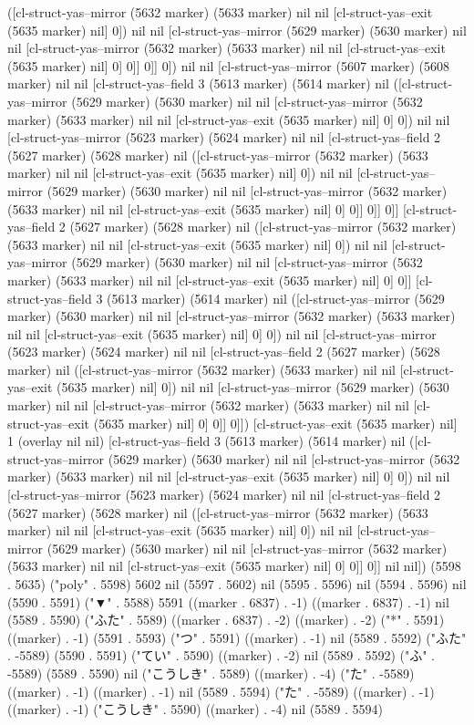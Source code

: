 ([cl-struct-yas--mirror (5632 marker) (5633 marker) nil nil [cl-struct-yas--exit (5635 marker) nil] 0]) nil nil [cl-struct-yas--mirror (5629 marker) (5630 marker) nil nil [cl-struct-yas--mirror (5632 marker) (5633 marker) nil nil [cl-struct-yas--exit (5635 marker) nil] 0] 0]] 0]] 0]) nil nil [cl-struct-yas--mirror (5607 marker) (5608 marker) nil nil [cl-struct-yas--field 3 (5613 marker) (5614 marker) nil ([cl-struct-yas--mirror (5629 marker) (5630 marker) nil nil [cl-struct-yas--mirror (5632 marker) (5633 marker) nil nil [cl-struct-yas--exit (5635 marker) nil] 0] 0]) nil nil [cl-struct-yas--mirror (5623 marker) (5624 marker) nil nil [cl-struct-yas--field 2 (5627 marker) (5628 marker) nil ([cl-struct-yas--mirror (5632 marker) (5633 marker) nil nil [cl-struct-yas--exit (5635 marker) nil] 0]) nil nil [cl-struct-yas--mirror (5629 marker) (5630 marker) nil nil [cl-struct-yas--mirror (5632 marker) (5633 marker) nil nil [cl-struct-yas--exit (5635 marker) nil] 0] 0]] 0]] 0]] [cl-struct-yas--field 2 (5627 marker) (5628 marker) nil ([cl-struct-yas--mirror (5632 marker) (5633 marker) nil nil [cl-struct-yas--exit (5635 marker) nil] 0]) nil nil [cl-struct-yas--mirror (5629 marker) (5630 marker) nil nil [cl-struct-yas--mirror (5632 marker) (5633 marker) nil nil [cl-struct-yas--exit (5635 marker) nil] 0] 0]] [cl-struct-yas--field 3 (5613 marker) (5614 marker) nil ([cl-struct-yas--mirror (5629 marker) (5630 marker) nil nil [cl-struct-yas--mirror (5632 marker) (5633 marker) nil nil [cl-struct-yas--exit (5635 marker) nil] 0] 0]) nil nil [cl-struct-yas--mirror (5623 marker) (5624 marker) nil nil [cl-struct-yas--field 2 (5627 marker) (5628 marker) nil ([cl-struct-yas--mirror (5632 marker) (5633 marker) nil nil [cl-struct-yas--exit (5635 marker) nil] 0]) nil nil [cl-struct-yas--mirror (5629 marker) (5630 marker) nil nil [cl-struct-yas--mirror (5632 marker) (5633 marker) nil nil [cl-struct-yas--exit (5635 marker) nil] 0] 0]] 0]]) [cl-struct-yas--exit (5635 marker) nil] 1 (overlay nil nil) [cl-struct-yas--field 3 (5613 marker) (5614 marker) nil ([cl-struct-yas--mirror (5629 marker) (5630 marker) nil nil [cl-struct-yas--mirror (5632 marker) (5633 marker) nil nil [cl-struct-yas--exit (5635 marker) nil] 0] 0]) nil nil [cl-struct-yas--mirror (5623 marker) (5624 marker) nil nil [cl-struct-yas--field 2 (5627 marker) (5628 marker) nil ([cl-struct-yas--mirror (5632 marker) (5633 marker) nil nil [cl-struct-yas--exit (5635 marker) nil] 0]) nil nil [cl-struct-yas--mirror (5629 marker) (5630 marker) nil nil [cl-struct-yas--mirror (5632 marker) (5633 marker) nil nil [cl-struct-yas--exit (5635 marker) nil] 0] 0]] 0]] nil nil]) (5598 . 5635) ("poly" . 5598) 5602 nil (5597 . 5602) nil (5595 . 5596) nil (5594 . 5596) nil (5590 . 5591) ("▼" . 5588) 5591 ((marker . 6837) . -1) ((marker . 6837) . -1) nil (5589 . 5590) ("ふた" . 5589) ((marker . 6837) . -2) ((marker) . -2) ("*" . 5591) ((marker) . -1) (5591 . 5593) ("つ" . 5591) ((marker) . -1) nil (5589 . 5592) ("ふた" . -5589) (5590 . 5591) ("てい" . 5590) ((marker) . -2) nil (5589 . 5592) ("ふ" . -5589) (5589 . 5590) nil ("こうしき" . 5589) ((marker) . -4) ("た" . -5589) ((marker) . -1) ((marker) . -1) nil (5589 . 5594) ("た" . -5589) ((marker) . -1) ((marker) . -1) ("こうしき" . 5590) ((marker) . -4) nil (5589 . 5594) 